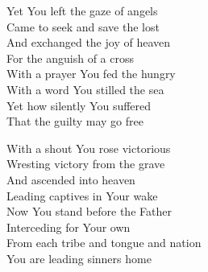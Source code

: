 \documentclass{beamer}
\begin{document}
{\hypertarget{Across the lands["You're the Word of God the Father"](Townend)2}{}
\begin{frame}{}
\fontsize{ 18 }{ 23 }\selectfont

Yet You left the gaze of angels\\ 
Came to seek and save the lost\\ 
And exchanged the joy of heaven\\ 
For the anguish of a cross\\ 
With a prayer You fed the hungry\\ 
With a word You stilled the sea\\ 
Yet how silently You suffered\\ 
That the guilty may go free 

\end{frame}

\hypertarget{Across the lands["You're the Word of God the Father"](Townend)3}{}
\begin{frame}{}
\fontsize{ 18 }{ 23 }\selectfont

With a shout You rose victorious\\ 
Wresting victory from the grave\\ 
And ascended into heaven\\ 
Leading captives in Your wake\\ 
Now You stand before the Father\\ 
Interceding for Your own\\ 
From each tribe and tongue and nation\\ 
You are leading sinners home 

\end{frame}

}
\end{document}
